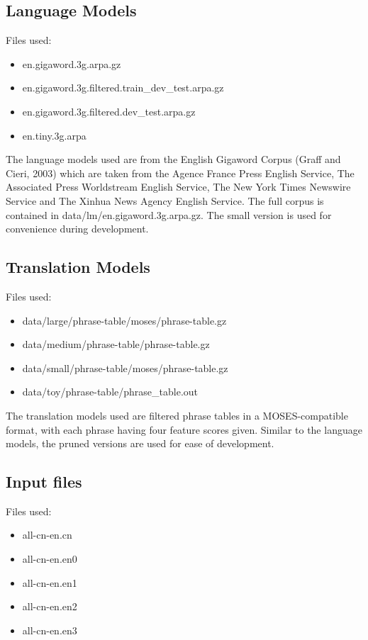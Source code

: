 \documentclass[11pt,letterpaper]{article}
\begin{document}
\subsection{Language Models}
Files used:

\begin{itemize}[noitemsep]
\item en.gigaword.3g.arpa.gz
\item en.gigaword.3g.filtered.train\_dev\_test.arpa.gz
\item en.gigaword.3g.filtered.dev\_test.arpa.gz
\item en.tiny.3g.arpa
\end{itemize}

The language models used are from the English Gigaword Corpus (Graff and Cieri, 2003) which are taken from the Agence France Press English Service, The Associated Press Worldstream English Service, The New York Times Newswire Service and The Xinhua News Agency English Service. The full corpus is contained in data/lm/en.gigaword.3g.arpa.gz. The small version is used for convenience during development.

\subsection{Translation Models}

Files used:

\begin{itemize}[noitemsep]
\item data/large/phrase-table/moses/phrase-table.gz
\item data/medium/phrase-table/phrase-table.gz
\item data/small/phrase-table/moses/phrase-table.gz
\item data/toy/phrase-table/phrase\_table.out
\end{itemize}

The translation models used are filtered phrase tables in a MOSES-compatible format, with each phrase having four feature scores given. Similar to the language models, the pruned versions are used for ease of development.

\subsection{Input files}


Files used:
\begin{itemize}[noitemsep]
\item all-cn-en.cn
\item all-cn-en.en0
\item all-cn-en.en1
\item all-cn-en.en2
\item all-cn-en.en3
\end{itemize}
\end{document}
